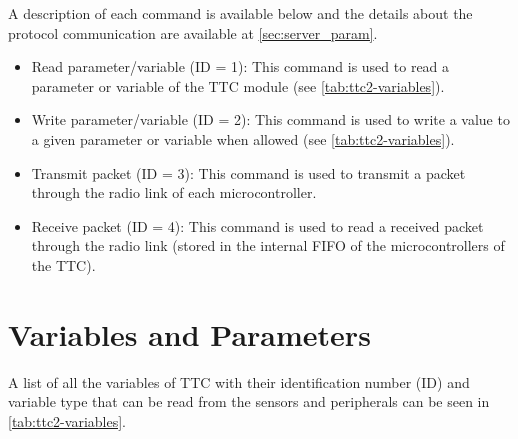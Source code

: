 A description of each command is available below and the details about the protocol communication are available at \autoref{sec:server_param}.

\begin{itemize}
    \item Read parameter/variable (ID = 1): This command is used to read a parameter or variable of the TTC module (see \autoref{tab:ttc2-variables}).
    \item Write parameter/variable (ID = 2): This command is used to write a value to a given parameter or variable when allowed (see \autoref{tab:ttc2-variables}).
    \item Transmit packet (ID = 3): This command is used to transmit a packet through the radio link of each microcontroller.
    \item Receive packet (ID = 4): This command is used to read a received packet through the radio link (stored in the internal FIFO of the microcontrollers of the TTC).
\end{itemize}

\section{Variables and Parameters}\label{sec:variables}

A list of all the variables of TTC with their identification number (ID) and variable type that can be read from the sensors and peripherals can be seen in \autoref{tab:ttc2-variables}.

